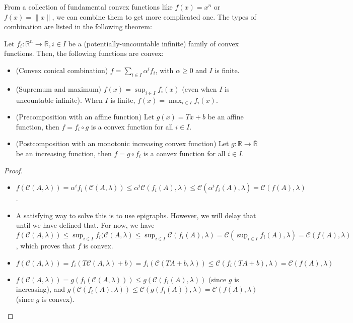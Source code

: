 From a collection of fundamental convex functions like \( f(x) = x^{n} \) or \(
f(x) = \|x\|\), we can combine them to get more complicated one. The types of
combination are listed in the following theorem:

\begin{theorem}
\label{thr:Operations on convex functions}
  Let \( f_{i}: \mathbb{R}^{n} \to  \overline{\mathbb{R}} , i \in I \) be a
  (potentially-uncountable infinite) family of convex functions. Then, the
  following functions are convex:
  \begin{itemize}
  \item (Convex conical combination) \( f = \sum_{i \in I} \alpha^{i}f_{i}  \),
    with \( \alpha \ge 0 \) and \( I \) is finite.
  \item (Supremum and maximum) \( f(x) = \sup_{i \in I} f_{i}(x)
    \) (even when \(  I\) is uncountable infinite). When \( I \) is finite, \(
    f(x) = \max_{i \in I} f_{i}(x) \).
  \item (Precomposition with an affine function) Let \( g(x) = Tx + b \) be an
    affine function, then \( f = f_{i} \circ g \) is a convex function for all \( i
    \in I\).
  \item (Postcomposition with an monotonic increasing convex function) Let \(
    g: \mathbb{R} \to  \overline{\mathbb{R}}  \) be an increasing function,
    then \( f = g \circ f_{i} \) is a convex function for all \( i \in I \).
  \end{itemize}
\end{theorem}

\begin{proof}
  \begin{itemize}
  \item \( f(\mathcal{C}(A, \lambda)) = \alpha^{i}f_{i}(\mathcal{C}(A, \lambda))
    \le \alpha^{i}\mathcal{C}(f_{i}(A), \lambda) \le
    \mathcal{C}(\alpha^{i}f_{i}(A), \lambda)=\mathcal{C}(f(A), \lambda)\).
  \item A satisfying way to solve this is to use epigraphs. However, we will
    delay that until we have defined that. For now, we have \( f(\mathcal{C}(A,
    \lambda)) \le \sup_{i \in I} f_{i}(\mathcal{C}(A, \lambda) \le
    \sup_{i \in I} \mathcal{C}(f_{i}(A), \lambda) = \mathcal{C}(\sup_{i \in I}
    f_{i}(A),     \lambda) = \mathcal{C}(f(A), \lambda)\), which proves that \(
    f\) is convex.
  \item \( f(\mathcal{C}(A, \lambda)) = f_{i}(T\mathcal{C}(A,
    \lambda) + b) = f_{i}(\mathcal{C}(TA + b, \lambda)) \le
    \mathcal{C}(f_{i}(TA+b), \lambda) = \mathcal{C}(f(A), \lambda) \)
  \item \( f(\mathcal{C}(A, \lambda)) = g(f_{i}(\mathcal{C}(A, \lambda))) \le
    g(\mathcal{C}(f_{i}(A), \lambda)) \) (since \( g \) is increasing), and \(
    g(\mathcal{C}(f_{i}(A), \lambda)) \le \mathcal{C}(g(f_{i}(A)), \lambda) =
    \mathcal{C}(f(A), \lambda) \) (since \( g \) is convex).
  \end{itemize}
\end{proof}

